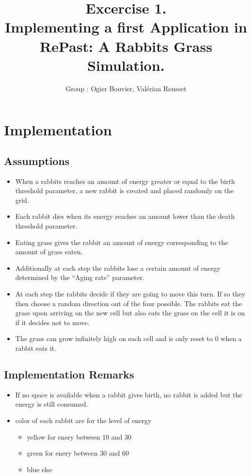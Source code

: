 \documentclass[11pt]{article}
\title{\bf Excercise 1.\\ Implementing a first Application in RePast: A Rabbits Grass Simulation.}
\author{Group \textnumero 17: Ogier Bouvier, Val\'erian Rousset}
\begin{document}
\maketitle

\section{Implementation}

\subsection{Assumptions}

\begin{itemize}
        \item When a rabbits reaches an amount of energy greater or
          equal to the birth threshold parameter, a new rabbit is
          created and placed randomly on the grid.
        \item Each rabbit dies when its energy reaches an amount lower
          than the death threshold parameter.
        \item Eating grass gives the rabbit an amount of energy
          corresponding to the amount of grass eaten.
        \item Additionally at each step the rabbits lose a certain
          amount of energy determined by the ``Aging rate'' parameter.
	\item At each step the rabbits decide if they are going to
          move this turn. If so they then choose a random direction
          out of the four possible. The rabbits eat the grass upon
          arriving on the new cell but also eats the grass on the cell
          it is on if it decides not to move.
        \item The grass can grow infinitely high on each cell and is
          only reset to 0 when a rabbit eats it.
\end{itemize}

\subsection{Implementation Remarks}

\begin{itemize}
        \item  If no space is available when a rabbit gives birth,
          no rabbit is added but the energy is still consumed.

	\item color of each rabbit are for the level of energy
	\begin{itemize}
		\item yellow for enery between 10 and 30
		\item green for enery between 30 and 60
		\item blue else
	\end{itemize}
\end{itemize}
\end{document}
